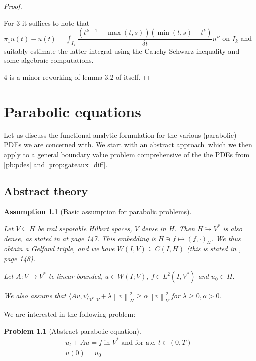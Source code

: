 \documentclass[english,a4paper,9pt,oneside]{scrbook}	%
\theoremstyle{break}
\newtheorem{ass}[equation]{Assumption}
\newtheorem{pb}[equation]{Problem}
\newenvironment{mproof}[1][\proofname]{%
  \begin{proof}[#1]$ $\par\nobreak\ignorespaces
}{%
  \end{proof}
}
\renewcommand*{\proofname}{Proof}
\theoremstyle{remark}
\newcommand{\ds}{\displaystyle}
\newcommand{\norm}[1]{\left\lVert#1\right\rVert}
\newcommand{\HN}[1]{\norm{#1}_{H}}
\newcommand{\VN}[1]{\norm{#1}_{V}}
\begin{document}
\begin{appendices}
\begin{mproof}
For $3$ it suffices to note that $\pi_1 u(t) - u(t) = \ds \int_{I_k} \dfrac{(t^{k+1}-\max(t,s))(\min(t, s)-t^k)}{\delta t}u''$ on $I_k$ and suitably estimate the latter integral using the Cauchy-Schwarz inequality and some algebraic computations.

$4$ is a minor reworking of lemma 3.2 of \cite{lshou} itself.
\end{mproof}

\chapter{Parabolic equations}
\label{chap:parab_eq}

Let us discuss the functional analytic formulation for the various (parabolic) PDEs we are concerned with. We start with an abstract approach, which we then apply to a general boundary value problem comprehensive of the the PDEs from \cref{pb:pdes} and \cref{prop:gateaux_diff}.

\section{Abstract theory}

\begin{ass}[Basic assumption for parabolic problems]
\label{ass:basic_par}

Let $V\subseteq H$ be real separable Hilbert spaces, $V$ dense in $H$. Then $H\hookrightarrow V^*$ is also dense, as stated in \cite{trol} at page 147. This embedding is $H \ni f \mapsto (f, \cdot )_H$. We thus obtain a Gelfand triple, and we have $W(I,V)\subseteq C(I,H)$ (this is stated in \cite{trol}, page 148).

Let $A:V\rightarrow V^* $ be linear bounded, $u \in W(I;V)$, $f \in L^2(I,V^*)$ and $u_0 \in H$.

We also assume that $\langle Av, v \rangle_{V^*,V}+ \lambda \HN{v}^2\geq \alpha \VN{v}^2$ for $\lambda \geq 0, \alpha >0$.
\end{ass}

We are interested in the following problem:

\begin{pb}[Abstract parabolic equation]
\label{eqn:general_parabolic}
\begin{align}
	u_t+Au=f \text{ in }V^* \text{ and for a.e. } t \in (0,T)\\
	u(0)=u_0
\end{align}
\end{pb}


\end{appendices}
\end{document}
